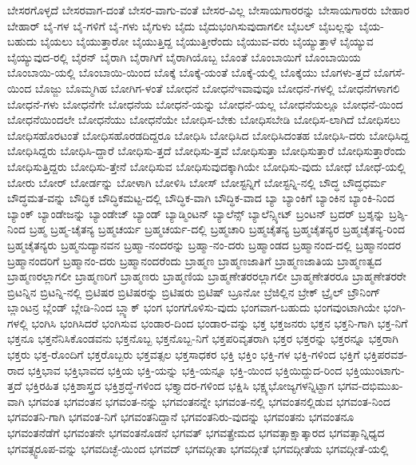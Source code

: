 {ಬೇಸರಗೊಳ್ಳದೆ
ಬೇಸರವಾಗ-ದಂತೆ
ಬೇಸರ-ವಾಗು-ವಂತೆ
ಬೇಸರ-ವಿಲ್ಲ
ಬೇಸಾಯಗಾರರನ್ನು
ಬೇಸಾಯಗಾರರು
ಬೇಹಾರ
ಬೇಹಾರ್
ಬೈ-ಗಳ
ಬೈ-ಗಳಿಗೆ
ಬೈ-ಗಳು
ಬೈಗುಳು
ಬೈದು
ಬೈದುಭಂಗಿಸುವುದಾಗಲೀ
ಬೈಬಲ್
ಬೈಬಲ್ಲನ್ನು
ಬೈಯ-ಬಹುದು
ಬೈಯಲು
ಬೈಯುತ್ತಾರೋ
ಬೈಯುತ್ತಿದ್ದ
ಬೈಯುತ್ತೀರೆಂದು
ಬೈಯುವ-ವರು
ಬೈಯ್ಯುತ್ತಾಳೆ
ಬೈಯ್ಯುವ
ಬೈಯ್ಯುವುದ-ರಲ್ಲಿ
ಬೈರನ್
ಬೈರಾಗಿ
ಬೈರಾಗಿಗೆ
ಬೈರಾಗಿಯೊಬ್ಬ
ಬೊಂತೆ
ಬೊಂಬಾಯಿಗೆ
ಬೊಂಬಾಯಿಯ
ಬೊಂಬಾಯಿ-ಯಲ್ಲಿ
ಬೊಂಬಾಯಿ-ಯಿಂದ
ಬೊಕ್ಕೆ
ಬೊಕ್ಕೆ-ಯಂತೆ
ಬೊಕ್ಕೆ-ಯಲ್ಲಿ
ಬೊಕ್ಕೆಯು
ಬೊಗಳು-ತ್ತದೆ
ಬೊಗಸೆ-ಯಿಂದ
ಬೊಜ್ಜು
ಬೊಮ್ಮಗಿಹ
ಬೋಗಿಗ-ಳಂತೆ
ಬೋಧನೆ
ಬೋಧನೆಇವಾವುವೂ
ಬೋಧನೆ-ಗಳಲ್ಲಿ
ಬೋಧನೆಗಳಾಗಲಿ
ಬೋಧನೆ-ಗಳು
ಬೋಧನೆಗೇ
ಬೋಧನೆಯ
ಬೋಧನೆ-ಯನ್ನು
ಬೋಧನೆ-ಯಲ್ಲ
ಬೋಧನೆಯಲ್ಲೂ
ಬೋಧನೆ-ಯಿಂದ
ಬೋಧನೆಯಿಂದಲೇ
ಬೋಧನೆಯು
ಬೋಧನೆಯೇ
ಬೋಧಿಸ-ಬೇಕು
ಬೋಧಿಸಬೇಡಿ
ಬೋಧಿಸ-ಲಾಗಿದೆ
ಬೋಧಿಸಲು
ಬೋಧಿಸಹೊರಟಂತೆ
ಬೋಧಿಸಹೊರಡದಿದ್ದರೂ
ಬೋಧಿಸಿ
ಬೋಧಿಸಿದ
ಬೋಧಿಸಿದಂತಹ
ಬೋಧಿಸಿ-ದರು
ಬೋಧಿಸಿದ್ದ
ಬೋಧಿಸಿದ್ದರು
ಬೋಧಿಸಿ-ದ್ದಾರೆ
ಬೋಧಿಸು-ತ್ತದೆ
ಬೋಧಿಸು-ತ್ತವೆ
ಬೋಧಿಸುತ್ತಾ
ಬೋಧಿಸುತ್ತಾರೆ
ಬೋಧಿಸುತ್ತಾರೆಂದು
ಬೋಧಿಸುತ್ತಿದ್ದರು
ಬೋಧಿಸು-ತ್ತೇನೆ
ಬೋಧಿಸುವ
ಬೋಧಿಸುವುದಕ್ಕಾಗಿಯೇ
ಬೋಧಿಸು-ವುದು
ಬೋಧೆ
ಬೋಧೆ-ಯಲ್ಲಿ
ಬೋರು
ಬೋರ್
ಬೋರ್ಡನ್ನು
ಬೋಳಾಗಿ
ಬೋಳಿಸಿ
ಬೋಸ್
ಬೋಸ್ಟನ್ನಿಗೆ
ಬೋಸ್ಟನ್ನಿ-ನಲ್ಲಿ
ಬೌದ್ಧ
ಬೌದ್ಧಧರ್ಮ
ಬೌದ್ಧಮತ-ವನ್ನು
ಬೌದ್ಧಿಕ
ಬೌದ್ಧಿಕಮಟ್ಟ-ದಲ್ಲಿ
ಬೌದ್ಧಿಕ-ವಾಗಿ
ಬೌದ್ಧಿಕ-ವಾದ
ಬ್ಯಾ
ಬ್ಯಾಂಕಿಗೆ
ಬ್ಯಾಂಕಿನ
ಬ್ಯಾಂಕಿ-ನಿಂದ
ಬ್ಯಾಂಕ್
ಬ್ಯಾಂಡೇಜನ್ನು
ಬ್ಯಾಂಡೇಜ್
ಬ್ಯಾಂಡ್
ಬ್ಯಾಡ್ಮಿಂಟನ್
ಬ್ಯಾಲೆನ್ಸ್
ಬ್ಯಾಲೆನ್ಸ್ಶೀಟ್
ಬ್ರಂಟನ್
ಬ್ರದರ್
ಬ್ರಶ್ಶನ್ನು
ಬ್ರಶ್ಶಿ-ನಿಂದ
ಬ್ರಹ್ಮ
ಬ್ರಹ್ಮ-ಚೈತನ್ಯ
ಬ್ರಹ್ಮಚರ್ಯ
ಬ್ರಹ್ಮಚರ್ಯ-ದಲ್ಲಿ
ಬ್ರಹ್ಮಚಾರಿ
ಬ್ರಹ್ಮಚೈತನ್ಯ
ಬ್ರಹ್ಮಚೈತನ್ಯರ
ಬ್ರಹ್ಮಚೈತನ್ಯ-ರಿಂದ
ಬ್ರಹ್ಮಚೈತನ್ಯರು
ಬ್ರಹ್ಮನುದ್ಯಾನವನ
ಬ್ರಹ್ಮಾ-ನಂದರನ್ನು
ಬ್ರಹ್ಮಾ-ನಂ-ದರು
ಬ್ರಹ್ಮಾಂಡದ
ಬ್ರಹ್ಮಾನಂದ-ದಲ್ಲಿ
ಬ್ರಹ್ಮಾನಂದರ
ಬ್ರಹ್ಮಾನಂದರಿಗೆ
ಬ್ರಹ್ಮಾನಂ-ದರು
ಬ್ರಹ್ಮಾನಂದರೆಂದು
ಬ್ರಾಹ್ಮಣ
ಬ್ರಾಹ್ಮಣಜಾತಿಗೆ
ಬ್ರಾಹ್ಮಣಜಾತಿಯ
ಬ್ರಾಹ್ಮಣತ್ವದ
ಬ್ರಾಹ್ಮಣರಲ್ಲಾಗಲೀ
ಬ್ರಾಹ್ಮಣರಿಗೆ
ಬ್ರಾಹ್ಮಣರು
ಬ್ರಾಹ್ಮಣಿಯ
ಬ್ರಾಹ್ಮಣೇತರರಲ್ಲಾಗಲೀ
ಬ್ರಾಹ್ಮಣೇತರರೂ
ಬ್ರಾಹ್ಮಣೇತರರೇ
ಬ್ರಿಟನ್ನಿನ
ಬ್ರಿಟನ್ನಿ-ನಲ್ಲಿ
ಬ್ರಿಟಿಷರ
ಬ್ರಿಟಿಷರನ್ನು
ಬ್ರಿಟಿಷರು
ಬ್ರಿಟಿಷ್
ಬ್ರೂನೋ
ಬ್ರೆಜಿಲ್ಲಿನ
ಬ್ರೇಕ್
ಬ್ರೈಲ್
ಬ್ರೌನಿಂಗ್
ಬ್ಲಾಂಟನ್ರ
ಬ್ಲೆಂಡ್
ಬ್ಲೇಡಿ-ನಿಂದ
ಬ್ಲ್ಯಾಕ್
ಭಂಗ
ಭಂಗಗೊಳಿಸು-ವುದು
ಭಂಗವಾಗ-ಬಹುದು
ಭಂಗವುಂಟಾಗಿಯೇ
ಭಂಗಿ-ಗಳಲ್ಲಿ
ಭಂಗಿಸಿ
ಭಂಗಿಸಿದರೆ
ಭಂಗಿಸುವ
ಭಂಡಾರ-ದಿಂದ
ಭಂಡಾರ-ವನ್ನು
ಭಕ್ತ
ಭಕ್ತಜನರು
ಭಕ್ತನ
ಭಕ್ತನಿ-ಗಾಗಿ
ಭಕ್ತ-ನಿಗೆ
ಭಕ್ತನೂ
ಭಕ್ತನೆನಿಸಿಕೊಂಡವನು
ಭಕ್ತನೊಬ್ಬ
ಭಕ್ತನೊಬ್ಬ-ನಿಗೆ
ಭಕ್ತಪರಿವೃತರಾಗಿ
ಭಕ್ತರ
ಭಕ್ತರನ್ನು
ಭಕ್ತರನ್ನೂ
ಭಕ್ತರಾಗಿ
ಭಕ್ತರು
ಭಕ್ತ-ರೊಂದಿಗೆ
ಭಕ್ತರೊಬ್ಬರು
ಭಕ್ತವತ್ಸಲ
ಭಕ್ತಸಾಧಕರ
ಭಕ್ತಿ
ಭಕ್ತಿಂ
ಭಕ್ತಿ-ಗಳ
ಭಕ್ತಿ-ಗಳಿಂದ
ಭಕ್ತಿಗೆ
ಭಕ್ತಿಪರವಶ-ರಾದ
ಭಕ್ತಿಭಾವ
ಭಕ್ತಿಭಾವದ
ಭಕ್ತಿಯ
ಭಕ್ತಿ-ಯನ್ನು
ಭಕ್ತಿ-ಯನ್ನೂ
ಭಕ್ತಿ-ಯಿಂದ
ಭಕ್ತಿಯಿದ್ದುದ-ರಿಂದ
ಭಕ್ತಿಯುಂಟಾಗು-ತ್ತದೆ
ಭಕ್ತಿರಹಿತ
ಭಕ್ತಿಶಾಸ್ತ್ರದ
ಭಕ್ತಿಶ್ರದ್ಧೆ-ಗಳಿಂದ
ಭಕ್ತ್ಯಾದರ-ಗಳಿಂದ
ಭಕ್ಷಿಸಿ
ಭಕ್ಷ್ಯಭೋಜ್ಯಗಳನ್ನಿಟ್ಟಾಗ
ಭಗವ-ದಭಿಮುಖ-ವಾಗಿ
ಭಗವಂತ
ಭಗವಂತನ
ಭಗವಂತ-ನನ್ನು
ಭಗವಂತನನ್ನೇ
ಭಗವಂತ-ನಲ್ಲಿ
ಭಗವಂತನಲ್ಲಿಡುವ
ಭಗವಂತ-ನಿಂದ
ಭಗವಂತನಿ-ಗಾಗಿ
ಭಗವಂತ-ನಿಗೆ
ಭಗವಂತನಿದ್ದಾನೆ
ಭಗವಂತನಿರು-ವುದನ್ನು
ಭಗವಂತನು
ಭಗವಂತನೂ
ಭಗವಂತನೆಡೆಗೆ
ಭಗವಂತನೇ
ಭಗವಂತನೊಡನೆ
ಭಗವತ್
ಭಗವತ್ಪ್ರೇಮದ
ಭಗವತ್ಸಾಕ್ಷಾತ್ಕಾರದ
ಭಗವತ್ಸಾನ್ನಿಧ್ಯದ
ಭಗವತ್ಸ್ವರೂಪ-ವನ್ನು
ಭಗವದಿಚ್ಛೆ-ಯಿಂದ
ಭಗವದ್
ಭಗವದ್ಗೀತಾ
ಭಗವದ್ಗೀತೆ
ಭಗವದ್ಗೀತೆಯ
ಭಗವದ್ಗೀತೆ-ಯಲ್ಲಿ
}
